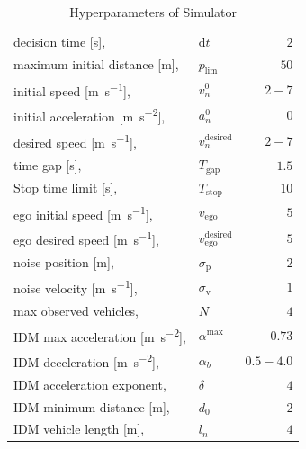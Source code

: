 \begin{table}[!bt]
\renewcommand{\arraystretch}{1.2}
\caption{Hyperparameters of Simulator}
\label{tab:hyperparameters}
\centering
\begin{tabular}{l l r}
    \toprule
    
    decision time [\unit{\second}], & $\mathrm{d}t$ & $2$\\
        maximum initial distance [\unit{\meter}], & $p_\mathrm{lim}$ & $50$\\ 
    initial speed [\unit{\meter\per\second}], & $v^0_n $ & $2-7$\\
    initial acceleration [\unit{\meter\per\second\squared}], & $a^0_n $ & $0$\\
    desired speed [\unit{\meter\per\second}], & $v^\mathrm{desired}_n$ & $2-7$\\
    time gap [\unit{\second}], & $T_\mathrm{gap}$ & $1.5$\\
    Stop time limit [\unit{\second}], & $T_\mathrm{stop}$ & $10$\\
    ego initial speed [\unit{\meter\per\second}], & $v_\mathrm{ego}$ & $5$\\
    ego desired speed [\unit{\meter\per\second}], & $v_\mathrm{ego}^\mathrm{desired}$ & $5$\\
    noise position [\unit{\meter}], & $\sigma_\mathrm{p}$ & $2$\\ 
    noise velocity [\unit{\meter\per\second}], & $\sigma_\mathrm{v}$ & $1$\\ 
    max observed vehicles, & $N$ & $4$\\ 

        \midrule
        IDM max acceleration [\unit{\meter\per\second\squared}], & $\alpha^{\mathrm{max}} $ & $0.73$\\
        IDM deceleration [\unit{\meter\per\second\squared}], & $\alpha_b $ & $0.5 - 4.0$\\
        IDM acceleration exponent, & $\delta$ & $4$\\
        IDM minimum distance [\unit{\meter}], & $d_0$ & $2$\\
        IDM vehicle length [\unit{\meter}], & $l_n$ & $4$\\
    \midrule
    

\end{tabular}
\end{table}
